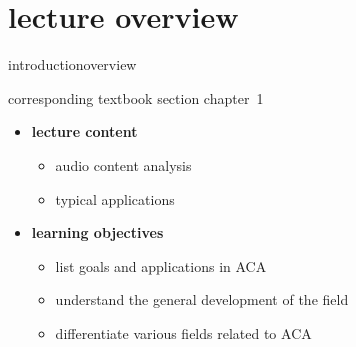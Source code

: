 


\subtitle{Module 1.0: Introduction to MIR/ACA}


	

    \section[overview]{lecture overview}
        \begin{frame}{introduction}{overview}
            \begin{block}{corresponding textbook section}
                    chapter~1
            \end{block}
            \vspace{5mm}

            \begin{itemize}
                \item   \textbf{lecture content}
                    \begin{itemize}
                        \item   audio content analysis
                        \item   typical applications
                    \end{itemize}
                \bigskip
                \item<2->   \textbf{learning objectives}
                    \begin{itemize}
                        \item   list goals and applications in ACA
                        \item   understand the general development of the field
                        \item   differentiate various fields related to ACA
                    \end{itemize}
            \end{itemize}
        \end{frame}
        
